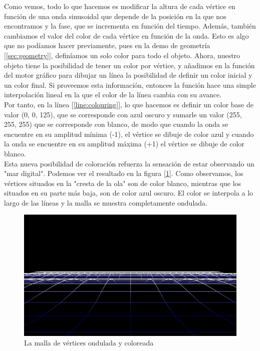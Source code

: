 Como vemos, todo lo que hacemos es modificar la altura de cada vértice en función de una onda sinusoidal que depende de la posición en la que nos encontramos y la fase, que se incrementa en función del tiempo. Además, también cambiamos el valor del color de cada vértice en función de la onda. Esto es algo que no podíamos hacer previamente, pues en la demo de geometría [\ref{sec:geometry}], definíamos un solo color para todo el objeto. Ahora, nuestro objeto tiene la posibilidad de tener un color por vértice, y añadimos en la función del motor gráfico para dibujar un línea la posibilidad de definir un color inicial y un color final. Si proveemos esta información, entonces la función hace una simple interpolación lineal en la que el color de la línea cambia con su avance.\\

Por tanto, en la línea [\ref{line:colouring}], lo que hacemos es definir un color base de valor (0, 0, 125), que se corresponde con azul oscuro y sumarle un valor (255, 255, 255) que se corresponde con blanco, de modo que cuando la onda se encuentre en su amplitud mínima (-1), el vértice se dibuje de color azul y cuando la onda se encuentre en su amplitud máxima (+1) el vértice se dibuje de color blanco.\\

Esta nueva posibilidad de coloración refuerza la sensación de estar observando un "mar digital". Podemos ver el resultado en la figura [\ref{fig:digitalsea}]. Como observamos, los vértices situados en la "cresta de la ola" son de color blanco, mientras que los situados en su parte más baja, son de color azul oscuro. El color se interpola a lo largo de las líneas y la malla se muestra completamente ondulada.\\

\begin{figure}[h]
	\centering
	\includegraphics[width=12cm]{archivos/digitalsea}
	\caption{La malla de vértices ondulada y coloreada}
	\label{fig:digitalsea}
\end{figure}

